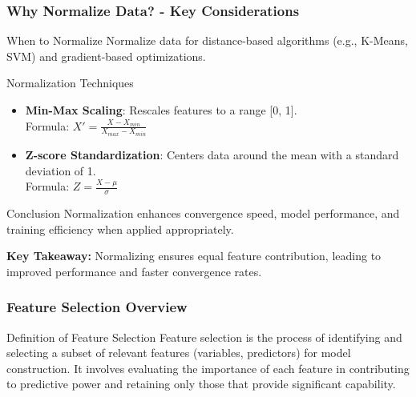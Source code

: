 \documentclass[aspectratio=169]{beamer}
\begin{document}
\begin{frame}[fragile]
  \frametitle{Why Normalize Data? - Key Considerations}
  \begin{block}{When to Normalize}
    Normalize data for distance-based algorithms (e.g., K-Means, SVM) and gradient-based optimizations.
  \end{block}

  \begin{block}{Normalization Techniques}
    \begin{itemize}
      \item \textbf{Min-Max Scaling}: Rescales features to a range [0, 1].\\
      Formula: \(X' = \frac{X - X_{min}}{X_{max} - X_{min}}\)
      \item \textbf{Z-score Standardization}: Centers data around the mean with a standard deviation of 1.\\
      Formula: \(Z = \frac{X - \mu}{\sigma}\)
    \end{itemize}
  \end{block}
  
  \begin{block}{Conclusion}
    Normalization enhances convergence speed, model performance, and training efficiency when applied appropriately.
  \end{block}
  
  \textbf{Key Takeaway:} Normalizing ensures equal feature contribution, leading to improved performance and faster convergence rates.
\end{frame}

\begin{frame}[fragile]
    \frametitle{Feature Selection Overview}
    \begin{block}{Definition of Feature Selection}
        Feature selection is the process of identifying and selecting a subset of relevant features (variables, predictors) for model construction. It involves evaluating the importance of each feature in contributing to predictive power and retaining only those that provide significant capability.
    \end{block}
\end{frame}
\end{document}
